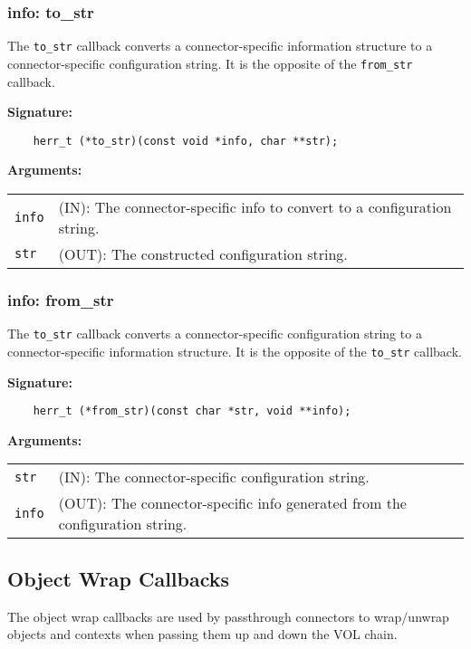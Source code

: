 \subsubsection{info: to\_str}
The \texttt{to\_str} callback converts a connector-specific information structure to a connector-specific configuration string. It is the opposite of the \texttt{from\_str} callback.

\begin{mdframed}[style=bgbox]
\textbf{Signature:}
\begin{lstlisting}
    herr_t (*to_str)(const void *info, char **str);
\end{lstlisting}
\textbf{Arguments:}\\
\begin{tabular}{l p{13.5cm}}
  \texttt{info} & (IN): The connector-specific info to convert to a configuration string.\\
  \texttt{str} & (OUT): The constructed configuration string.\\
\end{tabular}
\end{mdframed}

\subsubsection{info: from\_str}
The \texttt{to\_str} callback converts a connector-specific configuration string to a connector-specific information structure. It is the opposite of the \texttt{to\_str} callback.

\begin{mdframed}[style=bgbox]
\textbf{Signature:}
\begin{lstlisting}
    herr_t (*from_str)(const char *str, void **info);
\end{lstlisting}
\textbf{Arguments:}\\
\begin{tabular}{l p{13.5cm}}
  \texttt{str} & (IN): The connector-specific configuration string.\\
  \texttt{info} & (OUT): The connector-specific info generated from the configuration string.\\
\end{tabular}
\end{mdframed}



\subsection{Object Wrap Callbacks}
The object wrap callbacks are used by passthrough connectors to wrap/unwrap
objects and contexts when passing them up and down the VOL chain.

